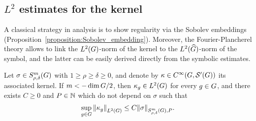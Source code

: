 \subsection{\texorpdfstring{$L^2$}{L2} estimates for the kernel}

A classical strategy in analysis is to show regularity via the Sobolev embeddings (Proposition~\ref{proposition:Sobolev_embedding}).
Moreover,
the Fourier-Plancherel theory allows to link the $\Lebesgue 2 \Group$-norm of the kernel to the $\LebesgueDual 2 \Group$-norm of the symbol,
and the latter can be easily derived directly from the symbolic estimates.

\begin{proposition}
\label{proposition:L2_bound_on_the_kernel}
    Let $\sigma \in \SymbolClass m {\rho, \delta}$ with $1 \geq \rho \geq \delta \geq 0$,
    and denote by $\kappa \in \SmoothFunctions {\Group, \TemperedDistributions \Group}$ its associated kernel.
    If $m < -\dim \Group / 2$,
    then $\kappa_g \in \Lebesgue 2 \Group$ for every $g \in \Group$,
    and there exists $C \geq 0$ and $P \in \N$ which do not depend on $\sigma$ such that
    \begin{align*}
        \sup_{g \in \Group} \norm [\Lebesgue 2 \Group] {\kappa_g} \leq C \SymbolSemiNorm m {\rho, \delta} P \sigma.
    \end{align*}
\end{proposition}

